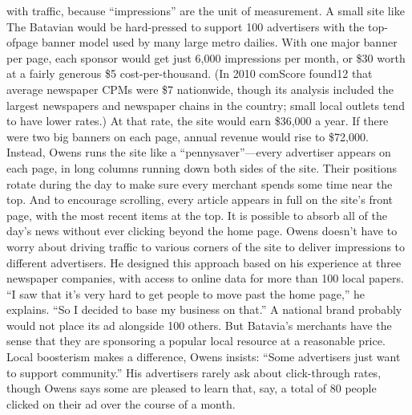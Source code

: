 with traffic, because ``impressions'' are the unit of measurement. A small site like
The Batavian would be hard-pressed to support 100 advertisers with the top-ofpage
banner model used by many large metro dailies. With one major banner per
page, each sponsor would get just 6,000 impressions per month, or \$30 worth at
a fairly generous \$5 cost-per-thousand. (In 2010 comScore found12 that average
newspaper CPMs were \$7 nationwide, though its analysis included the largest
newspapers and newspaper chains in the country; small local outlets tend to have
lower rates.) At that rate, the site would earn \$36,000 a year. If there were two big
banners on each page, annual revenue would rise to \$72,000.
Instead, Owens runs the site like a ``pennysaver''—every advertiser appears on
each page, in long columns running down both sides of the site. Their positions
rotate during the day to make sure every merchant spends some time near the
top. And to encourage scrolling, every article appears in full on the site’s front
page, with the most recent items at the top. It is possible to absorb all of the day’s
news without ever clicking beyond the home page. Owens doesn’t have to worry
about driving traffic to various corners of the site to deliver impressions to different
advertisers. He designed this approach based on his experience at three
newspaper companies, with access to online data for more than 100 local papers.
``I saw that it’s very hard to get people to move past the home page,'' he explains.
``So I decided to base my business on that.''
A national brand probably would not place its ad alongside 100 others. But
Batavia’s merchants have the sense that they are sponsoring a popular local resource
at a reasonable price. Local boosterism makes a difference, Owens insists:
``Some advertisers just want to support community.'' His advertisers rarely ask
about click-through rates, though Owens says some are pleased to learn that, say,
a total of 80 people clicked on their ad over the course of a month.

